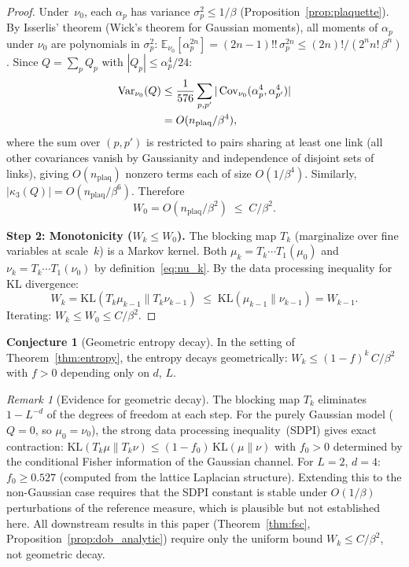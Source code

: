 \documentclass[11pt,a4paper]{article}
\theoremstyle{plain}
\theoremstyle{definition}
\newtheorem{conjecture}[theorem]{Conjecture}
\theoremstyle{remark}
\newtheorem{remark}[theorem]{Remark}
\newcommand{\E}{\mathbb{E}}
\newcommand{\Var}{\operatorname{Var}}
\newcommand{\Cov}{\operatorname{Cov}}
\newcommand{\KL}{\mathrm{KL}}
\begin{document}
\begin{proof}
Under~$\nu_0$, each $\alpha_p$ has variance
$\sigma_p^2 \leq 1/\beta$
(Proposition~\ref{prop:plaquette}).
By Isserlis' theorem (Wick's theorem for Gaussian
moments), all moments of $\alpha_p$ under $\nu_0$
are polynomials in $\sigma_p^2$:
$\E_{\nu_0}[\alpha_p^{2n}]
= (2n{-}1)!!\,\sigma_p^{2n} \leq
(2n)!/(2^n n!\,\beta^n)$.
Since $Q = \sum_p Q_p$ with $|Q_p| \leq
\alpha_p^4/24$:
\begin{align}
  \Var_{\nu_0}(Q) &\leq
  \frac{1}{576}\sum_{p,p'}
  |\Cov_{\nu_0}(\alpha_p^4, \alpha_{p'}^4)|
  \notag\\
  &= O(n_{\mathrm{plaq}}/\beta^4),
  \label{eq:varQ}
\end{align}
where the sum over $(p, p')$ is restricted to pairs
sharing at least one link (all other covariances
vanish by Gaussianity and independence of disjoint
sets of links), giving $O(n_{\mathrm{plaq}})$ nonzero
terms each of size $O(1/\beta^4)$.
Similarly, $|\kappa_3(Q)| = O(n_{\mathrm{plaq}}/\beta^6)$.
Therefore
\begin{equation}\label{eq:W0}
  W_0 = O(n_{\mathrm{plaq}}/\beta^2)
  \;\leq\; C/\beta^2.
\end{equation}

\smallskip
\noindent\textbf{Step 2: Monotonicity ($W_k \leq W_0$).}
The blocking map $T_k$ (marginalize over fine variables
at scale~$k$) is a Markov kernel.  Both $\mu_k = T_k
\cdots T_1(\mu_0)$ and $\nu_k = T_k \cdots T_1(\nu_0)$
by definition~\eqref{eq:nu_k}.
By the data processing inequality for KL divergence:
\begin{equation}
  W_k = \KL(T_k \mu_{k-1} \| T_k \nu_{k-1})
  \;\leq\; \KL(\mu_{k-1} \| \nu_{k-1})
  = W_{k-1}.
\end{equation}
Iterating: $W_k \leq W_0 \leq C/\beta^2$.
\end{proof}

\begin{conjecture}[Geometric entropy decay]
\label{conj:entropy_geom}
In the setting of Theorem~\ref{thm:entropy}, the
entropy decays geometrically:
$W_k \leq (1-f)^k\,C/\beta^2$
with $f > 0$ depending only on $d$, $L$.
\end{conjecture}

\begin{remark}[Evidence for geometric decay]
\label{rem:geom_decay}
The blocking map $T_k$ eliminates
$1 - L^{-d}$ of the degrees of freedom at each step.
For the purely Gaussian model ($Q = 0$, so
$\mu_0 = \nu_0$), the strong data processing
inequality~\textup{(}SDPI\textup{)} gives exact
contraction: $\KL(T_k\mu \| T_k\nu)
\leq (1 - f_0)\,\KL(\mu \| \nu)$ with
$f_0 > 0$ determined by the conditional
Fisher information of the Gaussian channel.
For $L = 2$, $d = 4$: $f_0 \geq 0.527$
(computed from the lattice Laplacian structure).
Extending this to the non-Gaussian case requires
that the SDPI constant is stable under
$O(1/\beta)$ perturbations of the reference measure,
which is plausible but not established here.
All downstream results in this paper
\textup{(}Theorem~\ref{thm:fsc},
Proposition~\ref{prop:dob_analytic}\textup{)}
require only the uniform bound
$W_k \leq C/\beta^2$, not geometric decay.
\end{remark}
\end{document}
